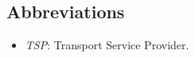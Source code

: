 \subsection{Abbreviations}
	\begin{itemize}
   	\item \textit{TSP}: Transport Service Provider. 
	\end{itemize}
